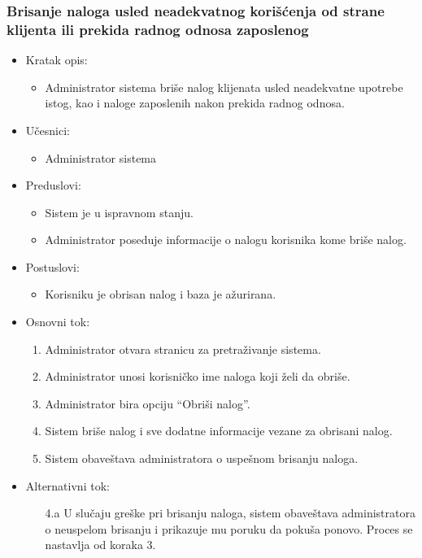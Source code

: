 \subsubsection{Brisanje naloga usled neadekvatnog korišćenja od strane klijenta ili prekida radnog odnosa zaposlenog}

\begin{itemize}
    \item Kratak opis:
        \begin{itemize}
            \item Administrator sistema briše nalog klijenata usled neadekvatne upotrebe istog, kao i naloge zaposlenih nakon prekida radnog odnosa.
        \end{itemize}
    \item Učesnici:
        \begin{itemize}
            \item Administrator sistema
        \end{itemize}
    \item Preduslovi:
        \begin{itemize}
            \item Sistem je u ispravnom stanju.
            \item Administrator poseduje informacije o nalogu korisnika kome briše nalog.
        \end{itemize}
    \item Postuslovi:
        \begin{itemize}
            \item Korisniku je obrisan nalog i baza je ažurirana.
        \end{itemize}
    \item Osnovni tok:
        \begin{enumerate}
         \item Administrator otvara stranicu za pretraživanje sistema.
         \item Administrator unosi korisničko ime naloga koji želi da obriše.
         \item Administrator bira opciju ``Obriši nalog''.
         \item Sistem briše nalog i sve dodatne informacije vezane za obrisani nalog.
         \item Sistem obaveštava administratora o uspešnom brisanju naloga.
        \end{enumerate}
    \item Alternativni tok:
        \begin{itemize}
            \item[4.a] U slučaju greške pri brisanju naloga, sistem obaveštava administratora o neuspelom brisanju i prikazuje mu poruku da pokuša ponovo. Proces se nastavlja od koraka 3.
        \end{itemize}
\end{itemize}

